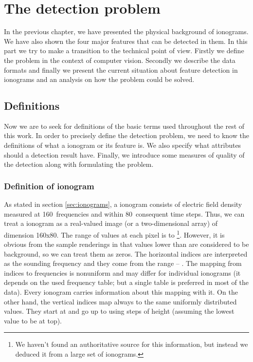 \chapter{The detection problem}
In the previous chapter, we have presented the physical background of ionograms. We have also shown the four major features that can be detected in them. In this part we try to make a transition to the technical point of view. Firstly we define the problem in the context of computer vision. Secondly we describe the data formats and finally we present the current situation about feature detection in ionograms and an analysis on how the problem could be solved.

\section{Definitions}
Now we are to seek for definitions of the basic terms used throughout the rest of this work. In order to precisely define the detection problem, we need to know the definitions of what a ionogram or its feature is. We also specify what attributes should a detection result have. Finally, we introduce some measures of quality of the detection along with formulating the problem.

\subsection{Definition of ionogram}
As stated in section \ref{sec:ionograms}, a ionogram consists of electric field density measured at 160~frequencies and within 80~consequent time steps. Thus, we can treat a ionogram as a real-valued image (or a two-dimensional array) of dimension 160x80. The range of values at each pixel is  to \footnote{We haven't found an authoritative source for this information, but instead we deduced it from a large set of ionograms.}. However, it is obvious from the sample renderings in \citep{FTP} that values lower than  are considered to be background, so we can treat them as zeros. The horizontal indices are interpreted as the sounding frequency and they come from the range  -- . The mapping from indices to frequencies is nonuniform and may differ for individual ionograms (it depends on the used frequency table; but a single table is preferred in most of the data). Every ionogram carries information about this mapping with it. On the other hand, the vertical indices map always to the same uniformly distributed values. They start at  and go up to  using steps of height  (assuming the lowest value to be at top).

